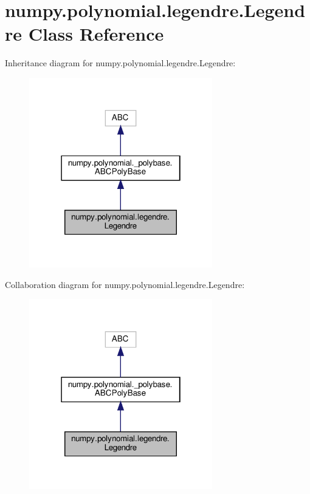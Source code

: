 \hypertarget{classnumpy_1_1polynomial_1_1legendre_1_1Legendre}{}\section{numpy.\+polynomial.\+legendre.\+Legendre Class Reference}
\label{classnumpy_1_1polynomial_1_1legendre_1_1Legendre}


Inheritance diagram for numpy.\+polynomial.\+legendre.\+Legendre\+:
\nopagebreak
\begin{figure}[H]
\begin{center}
\leavevmode
\includegraphics[width=226pt]{classnumpy_1_1polynomial_1_1legendre_1_1Legendre__inherit__graph}
\end{center}
\end{figure}


Collaboration diagram for numpy.\+polynomial.\+legendre.\+Legendre\+:
\nopagebreak
\begin{figure}[H]
\begin{center}
\leavevmode
\includegraphics[width=226pt]{classnumpy_1_1polynomial_1_1legendre_1_1Legendre__coll__graph}
\end{center}
\end{figure}
